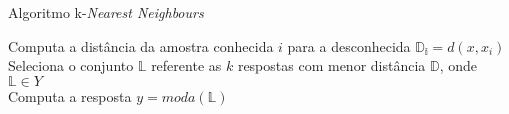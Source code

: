\begin{algorithm}
	\caption{Algoritmo k-\textit{Nearest Neighbours}}
	
	 {
		Computa a distância da amostra conhecida $i$ para a desconhecida $\mathbb{D_i} = d(x, x_i)$ \\
	}
	Seleciona o conjunto $\mathbb{L}$ referente as $k$ respostas com menor distância $\mathbb{D}$, onde $\mathbb{L} \in Y$ \\ 
	Computa a resposta $y = moda(\mathbb{L})$
\end{algorithm}
